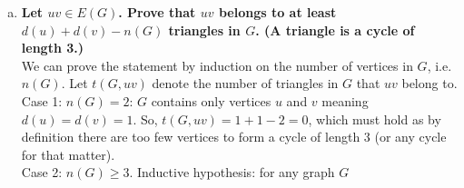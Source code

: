 \begin{enumerate}[a)]
    \linebreak 
    \boldmath
    \item \textbf{Let $uv \in E(G)$. Prove that $uv$ belongs to at least $d(u)+d(v)-n(G)$ triangles in $G$. (A triangle is a cycle of length 3.)} 
    \unboldmath
    \\
    \linebreak 
    We can prove the statement by induction on the number of vertices in $G$, i.e. $n(G)$. Let $t(G, uv)$ denote the number of triangles in $G$ that $uv$ belong to. \\
    \linebreak 
    Case 1: $n(G) = 2$: $G$ contains only vertices $u$ and $v$ meaning $d(u) = d(v) = 1$. So, $t(G, uv) = 1 + 1 - 2 = 0$, which must hold as by definition there are too few vertices to form a cycle of length 3 (or any cycle for that matter). \\
    \linebreak 
    Case 2: $n(G) \geq 3$. Inductive hypothesis: for any graph $G$ \\
    \linebreak 
\end{enumerate}